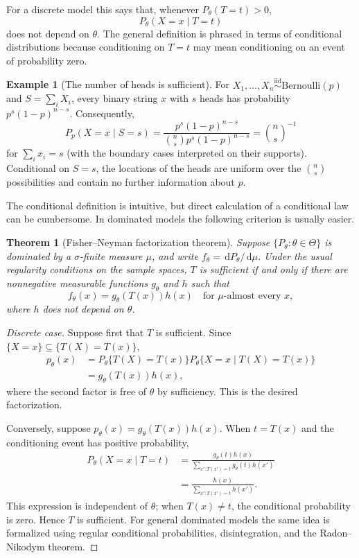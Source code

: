 \documentclass[12pt,oneside]{book}
\numberwithin{equation}{section}
\theoremstyle{definition}
\newtheorem{example}{Example}[section]
\theoremstyle{plain}
\newtheorem{theorem}{Theorem}[section]
\theoremstyle{remark}
\newcommand{\iid}{\overset{\text{iid}}{\sim}}
\newcommand{\dd}{\,\mathrm{d}}
\newcommand{\Bern}{\mathrm{Bernoulli}}
\begin{document}
For a discrete model this says that, whenever $P_\theta(T=t)>0$,
\begin{equation}
    P_\theta(X=x\mid T=t)
    \label{eq:conditional-sufficiency}
\end{equation}
does not depend on $\theta$.  The general definition is phrased in terms of
conditional distributions because conditioning on $T=t$ may mean
conditioning on an event of probability zero.

\begin{example}[The number of heads is sufficient]
For $X_1,\ldots,X_n\iid\Bern(p)$ and $S=\sum_iX_i$, every binary string $x$
with $s$ heads has probability $p^s(1-p)^{n-s}$.  Consequently,
\[
    P_p(X=x\mid S=s)
    =\frac{p^s(1-p)^{n-s}}{\binom ns p^s(1-p)^{n-s}}
    =\binom ns^{-1}
\]
for $\sum_i x_i=s$ (with the boundary cases interpreted on their supports).
Conditional on $S=s$, the locations of the heads are uniform over the
$\binom ns$ possibilities and contain no further information about $p$.
\end{example}

The conditional definition is intuitive, but direct calculation of a
conditional law can be cumbersome.  In dominated models the following
criterion is usually easier.

\begin{theorem}[Fisher--Neyman factorization theorem]
Suppose $\{P_\theta:\theta\in\Theta\}$ is dominated by a $\sigma$-finite
measure $\mu$, and write $f_\theta=\dd P_\theta/\dd\mu$.  Under the usual
regularity conditions on the sample spaces, $T$ is sufficient if and only if
there are nonnegative measurable functions $g_\theta$ and $h$ such that
\begin{equation}
    f_\theta(x)=g_\theta(T(x))h(x)
    \quad\text{for $\mu$-almost every }x,
    \label{eq:factorization-theorem}
\end{equation}
where $h$ does not depend on $\theta$.
\end{theorem}

\begin{proof}[Discrete case]
Suppose first that $T$ is sufficient. Since
$\{X=x\}\subseteq\{T(X)=T(x)\}$,
\begin{align*}
 p_\theta(x)
 &=P_\theta\{T(X)=T(x)\}
   P_\theta\{X=x\mid T(X)=T(x)\}\\
 &=g_\theta(T(x))h(x),
\end{align*}
where the second factor is free of $\theta$ by sufficiency. This is the
desired factorization.

Conversely, suppose $p_\theta(x)=g_\theta(T(x))h(x)$. When $t=T(x)$ and the
conditioning event has positive probability,
\begin{align*}
 P_\theta(X=x\mid T=t)
 &=\frac{g_\theta(t)h(x)}
 {\sum_{x':T(x')=t}g_\theta(t)h(x')}\\
 &=\frac{h(x)}{\sum_{x':T(x')=t}h(x')}.
\end{align*}
This expression is independent of $\theta$; when $T(x)\neq t$, the
conditional probability is zero. Hence $T$ is sufficient. For general
dominated models the same idea is formalized using regular conditional
probabilities, disintegration, and the Radon--Nikodym theorem.
\end{proof}
\end{document}
